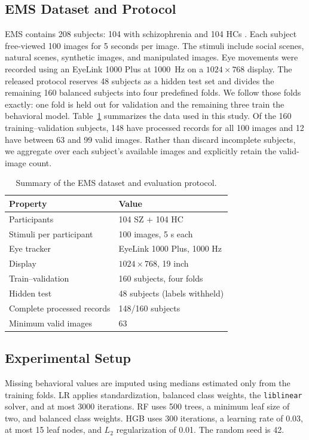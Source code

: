 \documentclass[conference,a4paper]{IEEEtran}
\begin{document}
\subsection{EMS Dataset and Protocol}
EMS contains 208 subjects: 104 with schizophrenia and 104 HCs \cite{song2024ems}. Each subject free-viewed 100 images for 5 seconds per image. The stimuli include social scenes, natural scenes, synthetic images, and manipulated images. Eye movements were recorded using an EyeLink 1000 Plus at 1000~Hz on a $1024\times768$ display. The released protocol reserves 48 subjects as a hidden test set and divides the remaining 160 balanced subjects into four predefined folds. We follow those folds exactly: one fold is held out for validation and the remaining three train the behavioral model. Table~\ref{tab:dataset} summarizes the data used in this study. Of the 160 training--validation subjects, 148 have processed records for all 100 images and 12 have between 63 and 99 valid images. Rather than discard incomplete subjects, we aggregate over each subject's available images and explicitly retain the valid-image count.

\begin{table}[t]
\caption{Summary of the EMS dataset and evaluation protocol.}
\label{tab:dataset}
\centering
\small
\begin{tabular}{@{}ll@{}}
\toprule
Property & Value \\
\midrule
Participants & 104 SZ + 104 HC \\
Stimuli per participant & 100 images, 5 s each \\
Eye tracker & EyeLink 1000 Plus, 1000 Hz \\
Display & $1024\times768$, 19 inch \\
Train--validation & 160 subjects, four folds \\
Hidden test & 48 subjects (labels withheld) \\
Complete processed records & 148/160 subjects \\
Minimum valid images & 63 \\
\bottomrule
\end{tabular}
\end{table}

\subsection{Experimental Setup}
Missing behavioral values are imputed using medians estimated only from the training folds. LR applies standardization, balanced class weights, the \texttt{liblinear} solver, and at most 3000 iterations. RF uses 500 trees, a minimum leaf size of two, and balanced class weights. HGB uses 300 iterations, a learning rate of 0.03, at most 15 leaf nodes, and $L_2$ regularization of 0.01. The random seed is 42.
\end{document}
